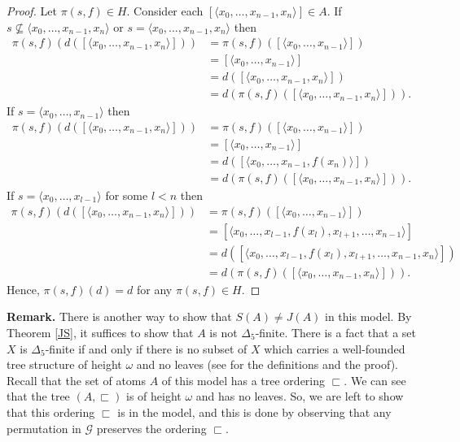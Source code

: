 \begin{proof}
Let $\pi(s,f)\in H$. Consider each $[\langle x_{0},\dotsc,x_{n-1}, x_{n}\rangle]\in A$. If $s\not\subseteq \langle x_{0},\dotsc,x_{n-1}, x_{n}\rangle$ or $s=\langle x_{0},\dotsc,x_{n-1}, x_{n}\rangle$ then 
\begin{align*}
\pi(s,f)(d([\langle x_{0},\dotsc,x_{n-1}, x_{n}\rangle])) 
&=\pi(s,f)([\langle x_{0},\dotsc,x_{n-1}\rangle]) \\
&= [\langle x_{0},\dotsc,x_{n-1}\rangle] \\
&= d([\langle x_{0},\dotsc,x_{n-1},x_{n}\rangle]) \\
&= d(\pi(s,f)([\langle x_{0},\dotsc,x_{n-1}, x_{n}\rangle])).
\end{align*}
If $s=\langle x_{0},\dotsc,x_{n-1}\rangle$ then 
\begin{align*}
\pi(s,f)(d([\langle x_{0},\dotsc,x_{n-1}, x_{n}\rangle])) 
&= \pi(s,f)([\langle x_{0},\dotsc,x_{n-1}\rangle])\\ 
&= [\langle x_{0},\dotsc,x_{n-1}\rangle] \\
&= d([\langle x_{0},\dotsc,x_{n-1},f(x_{n})\rangle]) \\
&= d(\pi(s,f)([\langle x_{0},\dotsc,x_{n-1}, x_{n}\rangle])).
\end{align*}
If $s=\langle x_{0},\dotsc, x_{l-1}\rangle$ for some $l<n$ then 
\begin{align*}
\pi(s,f)(d([\langle x_{0},\dotsc,x_{n-1}, x_{n}\rangle])) 
&= \pi(s,f)([\langle x_{0},\dotsc,x_{n-1}\rangle]) \\
&= [ \langle x_{0},\dotsc,x_{l-1},f(x_{l}),x_{l+1},\dotsc,x_{n-1}\rangle] \\
&= d([\langle x_{0},\dotsc,x_{l-1},f(x_{l}),x_{l+1},\dotsc,x_{n-1},x_{n}\rangle]) \\
&= d(\pi(s,f)([\langle x_{0},\dotsc,x_{n-1}, x_{n}\rangle])).
\end{align*}
Hence, $\pi(s,f)(d)=d$ for any $\pi(s,f)\in H$.
\end{proof}


\noindent\textbf{Remark.} There is another way to show that $S(A)\neq J(A)$ in this model. By Theorem \ref{JS}, it suffices to show that $A$ is not $\Delta_{5}$-finite. There is a fact that a set $X$ is $\Delta_5$-finite if and only if there is no subset of $X$ which carries a well-founded tree structure of height $\omega$ and no leaves (see \cite{PanaTruss} for the definitions and the proof). Recall that the set of atoms $A$ of this model has a tree ordering $\sqsubset$. We can see that the tree $(A,\sqsubset)$ is of height $\omega$ and has no leaves. So, we are left to show that this ordering $\sqsubset$ is in the model, and this is done by observing that any permutation in $\mathcal{G}$ preserves the ordering $\sqsubset$.
 